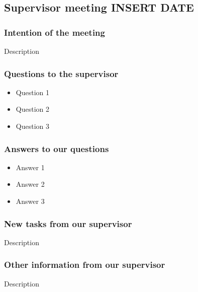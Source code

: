 \documentclass{article}
\begin{document}
\begin{center}
\subsection*{Supervisor meeting INSERT DATE}
\end{center}

\bigskip


\subsubsection*{Intention of the meeting}
Description


\subsubsection*{Questions to the supervisor}
\begin{itemize}
    \item Question 1
    \item Question 2
    \item Question 3
\end{itemize}


\subsubsection*{Answers to our questions}
\begin{itemize}
    \item Answer 1
    \item Answer 2
    \item Answer 3
\end{itemize}


\subsubsection*{New tasks from our supervisor}
Description

\subsubsection*{Other information from our supervisor}
Description
\end{document}
